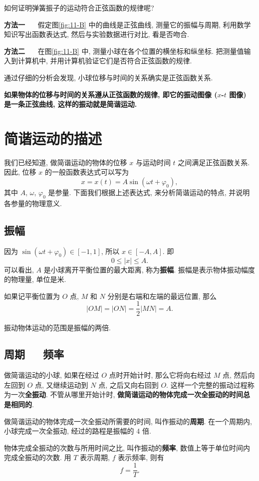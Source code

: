 \documentclass[UTF8,openany,fontset=fandol]{ctexbook}
\theoremstyle{chinesetextbook}
\newcommand{\bre}{\ \ \ }
\begin{document}
{\kaishu 如何证明弹簧振子的运动符合正弦函数的规律呢?}

\textbf{方法一} \bre 假定图\ref{fig:11-B} 中的曲线是正弦曲线, 测量它的振幅与周期, 利用数学知识写出函数表达式, 然后与实验数据进行对比, 看是否吻合.

\textbf{方法二} \bre 在图\ref{fig:11-B} 中, 测量小球在各个位置的横坐标和纵坐标. 把测量值输入到计算机中, 并用计算机验证它们是否符合正弦函数的规律.

通过仔细的分析会发现, 小球位移与时间的关系确实是正弦函数关系.

\textbf{如果物体的位移与时间的关系遵从正弦函数的规律, 即它的振动图像 ($x$-$t$ 图像) 是一条正弦曲线, 这样的振动就是简谐运动.}
\section{简谐运动的描述}
我们已经知道, 做简谐运动的物体的位移 $x$ 与运动时间 $t$ 之间满足正弦函数关系. 因此, 位移 $x$ 的一般函数表达式可以写为
\begin{equation}\label{eq:位移函数}
x=x(t)=A\sin(\omega t+\varphi_0),
\end{equation}
其中 $A$, $\omega$, $\varphi_0$ 是参量. 下面我们根据上述表达式, 来分析简谐运动的特点, 并说明各参量的物理意义.
\subsection{振幅}
因为 $\sin(\omega t+\varphi_0)\in [-1,1]$, 所以 $x\in [-A,A]$. 即
\[
0\leqslant |x|\leqslant A.
\]
可以看出, $A$ 是小球离开平衡位置的最大距离, 称为\textbf{振幅}. 振幅是表示物体振动幅度的物理量, 单位是米.

如果记平衡位置为 $O$ 点, $M$ 和 $N$ 分别是右端和左端的最远位置, 那么
\[
|OM|=|ON|=\frac12|MN|=A.
\]

振动物体运动的范围是振幅的两倍.
\subsection{周期\bre 频率}
做简谐运动的小球, 如果在经过 $O$ 点时开始计时, 那么它将向右经过 $M$ 点, 然后向左回到 $O$ 点, 又继续运动到 $N$ 点, 之后又向右回到 $O$. 这样一个完整的振动过程称为一次\textbf{全振动}. 不管从哪里开始计时, \textbf{做简谐运动的物体完成一次全振动的时间总是相同的}.

做简谐运动的物体完成一次全振动所需要的时间, 叫作振动的\textbf{周期}. 在一个周期内, 小球完成一次全振动, 经过的路程是振幅的 4 倍.

物体完成全振动的次数与所用时间之比, 叫作振动的\textbf{频率}, 数值上等于单位时间内完成全振动的次数. 用 $T$ 表示周期, $f$ 表示频率, 则有
\[
f=\frac{1}{T}.
\]
\end{document}
